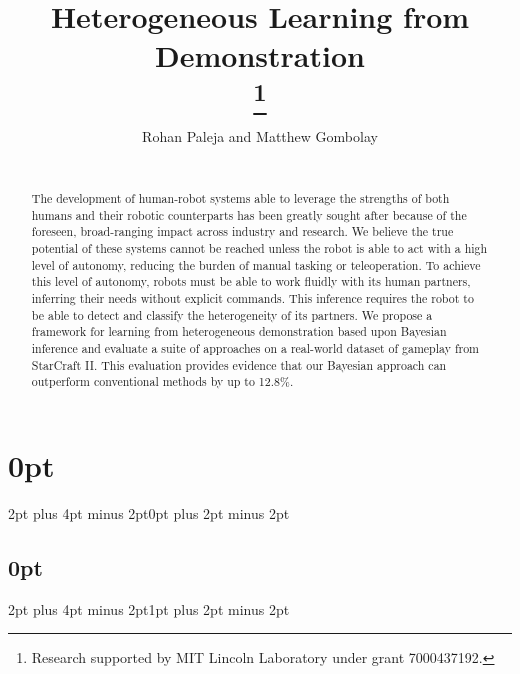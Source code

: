 \documentclass[conference]{IEEEtran}
\begin{document}
\titlespacing{\subsection}{0pt}{\parskip}{-\parskip}
\titlespacing\section{0pt}{2pt plus 4pt minus 2pt}{0pt plus 2pt minus 2pt}
\titlespacing\subsection{0pt}{2pt plus 4pt minus 2pt}{1pt plus 2pt minus 2pt}
\title{Heterogeneous Learning from Demonstration\\
\thanks{Research supported by MIT Lincoln Laboratory under grant 7000437192.}
}


\author{Rohan Paleja and Matthew Gombolay\\
 \\
}





\maketitle

\begin{abstract}
The development of human-robot systems able to leverage the strengths of both humans and their robotic counterparts has been greatly sought after because of the foreseen, broad-ranging impact  across industry and research. We believe the true potential of these systems cannot be reached unless the robot is able to act with a high level of autonomy, reducing the burden of manual tasking or teleoperation. To achieve this level of autonomy, robots must be able to work fluidly with its human partners, inferring their needs without explicit commands. This inference requires the robot to be able to detect and classify the heterogeneity of its partners. We propose a framework for learning from heterogeneous demonstration based upon Bayesian inference and evaluate a suite of approaches on a real-world dataset of gameplay from StarCraft II. This evaluation provides evidence that our Bayesian approach can outperform conventional methods by up to 12.8$\%$.

\end{abstract}
\end{document}
